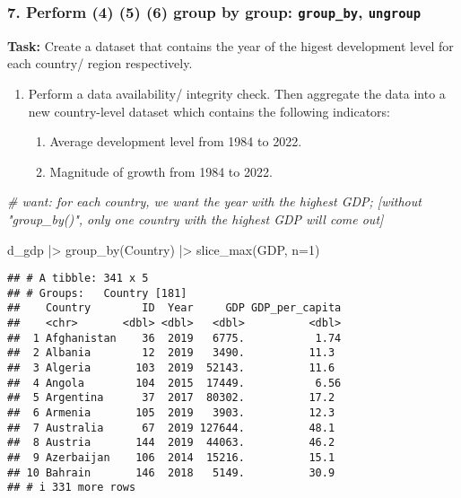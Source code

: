 \documentclass[
]{article}
\newenvironment{Shaded}{\begin{snugshade}}{\end{snugshade}}
\newcommand{\AttributeTok}[1]{\textcolor[rgb]{0.77,0.63,0.00}{#1}}
\newcommand{\CommentTok}[1]{\textcolor[rgb]{0.56,0.35,0.01}{\textit{#1}}}
\newcommand{\DecValTok}[1]{\textcolor[rgb]{0.00,0.00,0.81}{#1}}
\newcommand{\FunctionTok}[1]{\textcolor[rgb]{0.00,0.00,0.00}{#1}}
\newcommand{\NormalTok}[1]{#1}
\newcommand{\SpecialCharTok}[1]{\textcolor[rgb]{0.00,0.00,0.00}{#1}}
\providecommand{\tightlist}{%
  \setlength{\itemsep}{0pt}\setlength{\parskip}{0pt}}
\begin{document}
\hypertarget{perform-4-5-6-group-by-group-group_by-ungroup}{%
\subsubsection{\texorpdfstring{7. Perform (4) (5) (6) group by group:
\texttt{group\_by},
\texttt{ungroup}}{7. Perform (4) (5) (6) group by group: group\_by, ungroup}}\label{perform-4-5-6-group-by-group-group_by-ungroup}}

\textbf{Task:} Create a dataset that contains the year of the higest
development level for each country/ region respectively.

\begin{enumerate}
\def\labelenumi{\arabic{enumi}.}
\tightlist
\item
  Perform a data availability/ integrity check. Then aggregate the data
  into a new country-level dataset which contains the following
  indicators:

  \begin{enumerate}
  \def\labelenumii{\arabic{enumii}.}
  \item
    Average development level from 1984 to 2022.
  \item
    Magnitude of growth from 1984 to 2022.
  \end{enumerate}
\end{enumerate}

\begin{Shaded}
\begin{Highlighting}[]
\CommentTok{\# want: for each country, we want the year with the highest GDP; [without "group\_by()", only one country with the highest GDP will come out]}

\NormalTok{d\_gdp }\SpecialCharTok{|\textgreater{}}
  \FunctionTok{group\_by}\NormalTok{(Country) }\SpecialCharTok{|\textgreater{}}
  \FunctionTok{slice\_max}\NormalTok{(GDP, }\AttributeTok{n=}\DecValTok{1}\NormalTok{)}
\end{Highlighting}
\end{Shaded}

\begin{verbatim}
## # A tibble: 341 x 5
## # Groups:   Country [181]
##    Country        ID  Year     GDP GDP_per_capita
##    <chr>       <dbl> <dbl>   <dbl>          <dbl>
##  1 Afghanistan    36  2019   6775.           1.74
##  2 Albania        12  2019   3490.          11.3 
##  3 Algeria       103  2019  52143.          11.6 
##  4 Angola        104  2015  17449.           6.56
##  5 Argentina      37  2017  80302.          17.2 
##  6 Armenia       105  2019   3903.          12.3 
##  7 Australia      67  2019 127644.          48.1 
##  8 Austria       144  2019  44063.          46.2 
##  9 Azerbaijan    106  2014  15216.          15.1 
## 10 Bahrain       146  2018   5149.          30.9 
## # i 331 more rows
\end{verbatim}
\end{document}
